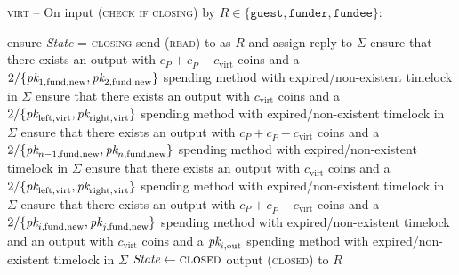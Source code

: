 \begin{center}
  \begin{processbox}{\textsc{virt} -- On input (\textsc{check if closing}) by
  $R \in \{\texttt{guest}, \texttt{funder}, \texttt{fundee}\}$:}
    \begin{algorithmic}[1]
      \State ensure \textit{State} = \textsc{closing}
      \State send (\textsc{read}) to \ledger as $R$ and assign reply to $\Sigma$
       
        \State ensure that there exists an output with $c_P + c_{\bar{P}} -
        c_{\mathrm{virt}}$ coins and a $2/\{\textit{pk}_{1, \mathrm{fund}, \mathrm{new}},
        \textit{pk}_{2, \mathrm{fund}, \mathrm{new}}\}$ spending method with
        expired/non-existent timelock in $\Sigma$ 
        \label{code:virtual-layer:check-chain-close:funder:output-virt}
        \State ensure that there exists an output with $c_{\mathrm{virt}}$ coins
        and a $2/\{\textit{pk}_{\mathrm{left}, \mathrm{virt}}, \textit{pk}_{\mathrm{right},
        \mathrm{virt}}\}$ spending method with expired/non-existent timelock in
        $\Sigma$ 
        \label{code:virtual-layer:check-chain-close:funder:output-funder}
       
        \State ensure that there exists an output with $c_P + c_{\bar{P}} -
        c_{\mathrm{virt}}$ coins and a $2/\{\textit{pk}_{n-1, \mathrm{fund},
        \mathrm{new}}, \textit{pk}_{n, \mathrm{fund}, \mathrm{new}}\}$ spending method
        with expired/non-existent timelock in $\Sigma$ 
        \State ensure that there exists an output with $c_{\mathrm{virt}}$ coins
        and a $2/\{\textit{pk}_{\mathrm{left}, \mathrm{virt}}, \textit{pk}_{\mathrm{right},
        \mathrm{virt}}\}$ spending method with expired/non-existent timelock in
        $\Sigma$ 
      \Else \: 
         
        \State ensure that there exists an output with $c_P + c_{\bar{P}} -
        c_{\mathrm{virt}}$ coins and a $2/\{\textit{pk}_{i, \mathrm{fund}, \mathrm{new}},
        \textit{pk}_{j, \mathrm{fund}, \mathrm{new}}\}$ spending method with
        expired/non-existent timelock and an output with $c_{\mathrm{virt}}$
        coins and a $\textit{pk}_{i, \mathrm{out}}$ spending method with
        expired/non-existent timelock in $\Sigma$
      \EndIf
      \State $\textit{State} \gets \textsc{closed}$
      \State output (\textsc{closed}) to $R$
    \end{algorithmic}
  \end{processbox}
  \label{code:virtual-layer:check-chain-close}
\end{center} \ \\

